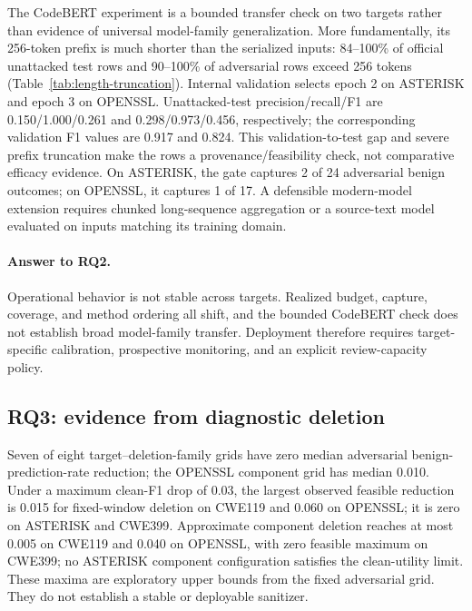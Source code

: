 \documentclass[a4paper,fleqn]{cas-dc}
\newcommand{\dataset}[1]{\textsc{#1}}
\begin{document}
The CodeBERT experiment is a bounded transfer check on two targets rather than evidence of universal model-family generalization. More fundamentally, its 256-token prefix is much shorter than the serialized inputs: 84--100\% of official unattacked test rows and 90--100\% of adversarial rows exceed 256 tokens (Table~\ref{tab:length-truncation}). Internal validation selects epoch 2 on \dataset{ASTERISK} and epoch 3 on \dataset{OPENSSL}. Unattacked-test precision/recall/F1 are 0.150/1.000/0.261 and 0.298/0.973/0.456, respectively; the corresponding validation F1 values are 0.917 and 0.824. This validation-to-test gap and severe prefix truncation make the rows a provenance/feasibility check, not comparative efficacy evidence. On \dataset{ASTERISK}, the gate captures 2 of 24 adversarial benign outcomes; on \dataset{OPENSSL}, it captures 1 of 17. A defensible modern-model extension requires chunked long-sequence aggregation or a source-text model evaluated on inputs matching its training domain.



\paragraph{Answer to RQ2.} Operational behavior is not stable across targets. Realized budget, capture, coverage, and method ordering all shift, and the bounded CodeBERT check does not establish broad model-family transfer. Deployment therefore requires target-specific calibration, prospective monitoring, and an explicit review-capacity policy.

\subsection{RQ3: evidence from diagnostic deletion}

Seven of eight target--deletion-family grids have zero median adversarial benign-prediction-rate reduction; the \dataset{OPENSSL} component grid has median 0.010. Under a maximum clean-F1 drop of 0.03, the largest observed feasible reduction is 0.015 for fixed-window deletion on \dataset{CWE119} and 0.060 on \dataset{OPENSSL}; it is zero on \dataset{ASTERISK} and \dataset{CWE399}. Approximate component deletion reaches at most 0.005 on \dataset{CWE119} and 0.040 on \dataset{OPENSSL}, with zero feasible maximum on \dataset{CWE399}; no \dataset{ASTERISK} component configuration satisfies the clean-utility limit. These maxima are exploratory upper bounds from the fixed adversarial grid. They do not establish a stable or deployable sanitizer.
\end{document}
